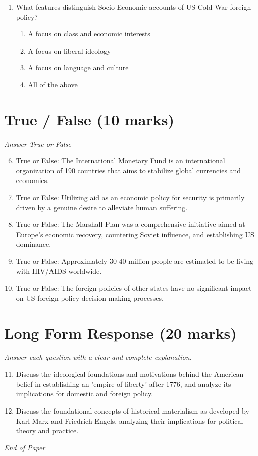 \documentclass[12pt]{article}
\begin{document}
\begin{enumerate}[label=\arabic*.]
\begin{enumerate}[label=(\alph*)]
    \item Alliances, diplomacy and protectionism
    \item The balance of power, self-sufficiency and prudence
    \item None of the above
\end{enumerate}
\item What features distinguish Socio-Economic accounts of US Cold War foreign policy?
\begin{enumerate}[label=(\alph*)]
    \item A focus on class and economic interests
    \item A focus on liberal ideology
    \item A focus on language and culture
    \item All of the above
\end{enumerate}
\end{enumerate}

\section*{True / False (10 marks)}
\textit{Answer True or False}
\begin{enumerate}[label=\arabic*.]
\setcounter{enumi}{5}
\item True or False: The International Monetary Fund is an international organization of 190 countries that aims to stabilize global currencies and economies.
\item True or False: Utilizing aid as an economic policy for security is primarily driven by a genuine desire to alleviate human suffering.
\item True or False: The Marshall Plan was a comprehensive initiative aimed at Europe's economic recovery, countering Soviet influence, and establishing US dominance.
\item True or False: Approximately 30-40 million people are estimated to be living with HIV/AIDS worldwide.
\item True or False: The foreign policies of other states have no significant impact on US foreign policy decision-making processes.
\end{enumerate}

\section*{Long Form Response (20 marks)}
\textit{Answer each question with a clear and complete explanation.}
\begin{enumerate}[label=\arabic*.]
\setcounter{enumi}{10}
\item Discuss the ideological foundations and motivations behind the American belief in establishing an 'empire of liberty' after 1776, and analyze its implications for domestic and foreign policy.
\item Discuss the foundational concepts of historical materialism as developed by Karl Marx and Friedrich Engels, analyzing their implications for political theory and practice.
\end{enumerate}

\vfill
\noindent\textit{End of Paper}
\end{document}
